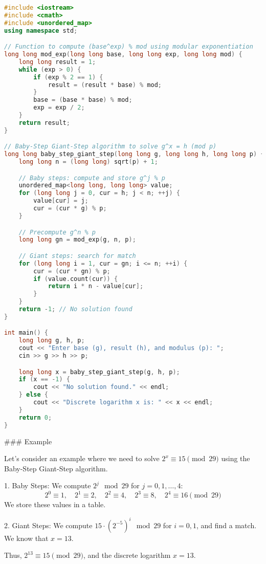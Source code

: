 \documentclass[10pt,a4paper]{article}
\begin{document}
\begin{lstlisting}[language=C++]
#include <iostream>
#include <cmath>
#include <unordered_map>
using namespace std;

// Function to compute (base^exp) % mod using modular exponentiation
long long mod_exp(long long base, long long exp, long long mod) {
    long long result = 1;
    while (exp > 0) {
        if (exp % 2 == 1) {
            result = (result * base) % mod;
        }
        base = (base * base) % mod;
        exp = exp / 2;
    }
    return result;
}

// Baby-Step Giant-Step algorithm to solve g^x = h (mod p)
long long baby_step_giant_step(long long g, long long h, long long p) {
    long long n = (long long) sqrt(p) + 1;

    // Baby steps: compute and store g^j % p
    unordered_map<long long, long long> value;
    for (long long j = 0, cur = h; j < n; ++j) {
        value[cur] = j;
        cur = (cur * g) % p;
    }

    // Precompute g^n % p
    long long gn = mod_exp(g, n, p);

    // Giant steps: search for match
    for (long long i = 1, cur = gn; i <= n; ++i) {
        cur = (cur * gn) % p;
        if (value.count(cur)) {
            return i * n - value[cur];
        }
    }
    return -1; // No solution found
}

int main() {
    long long g, h, p;
    cout << "Enter base (g), result (h), and modulus (p): ";
    cin >> g >> h >> p;

    long long x = baby_step_giant_step(g, h, p);
    if (x == -1) {
        cout << "No solution found." << endl;
    } else {
        cout << "Discrete logarithm x is: " << x << endl;
    }
    return 0;
}
\end{lstlisting}

### Example

Let’s consider an example where we need to solve \(2^x \equiv 15 \pmod{29}\) using the Baby-Step Giant-Step algorithm.

1. Baby Steps: We compute \(2^j \mod 29\) for \(j = 0, 1, \dots, 4\):
\[
2^0 \equiv 1, \quad 2^1 \equiv 2, \quad 2^2 \equiv 4, \quad 2^3 \equiv 8, \quad 2^4 \equiv 16 \pmod{29}
\]
We store these values in a table.

2. Giant Steps: We compute \(15 \cdot (2^{-5})^i \mod 29\) for \(i = 0, 1\), and find a match. We know that \(x = 13\).

Thus, \(2^{13} \equiv 15 \pmod{29}\), and the discrete logarithm \(x = 13\).
\end{document}
